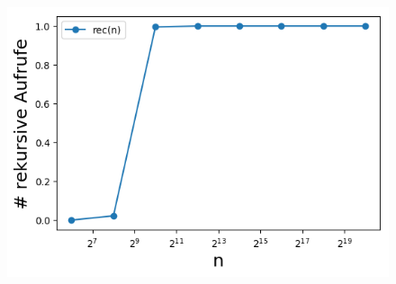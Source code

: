 \begin{figure}[H]
    \begin{minipage}[t]{.30\textwidth}
        \centering
        \includegraphics[width=1.21\textwidth]{pictures/min_theo4_2_rec.png}
    \end{minipage}
    \vspace*{-.1cm}
    \label{fig: min_theo4_fit_rem}
\end{figure}


